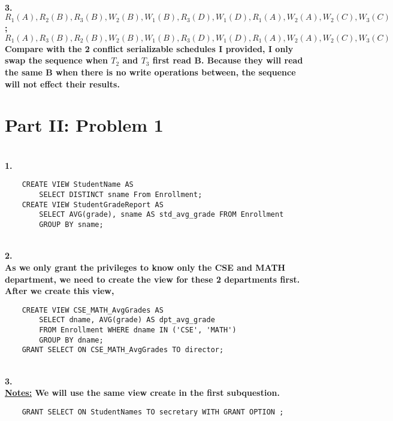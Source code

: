 \documentclass[letterpaper,11pt]{article}
\newcommand{\Paragraph}[1]{~\vspace*{-0.7\baselineskip}\\{\bf #1}}
\begin{document}
\Paragraph{3. \\
	\(R_1(A), R_2(B), R_3(B), W_2(B), W_1(B), R_3(D), W_1(D), R_1(A), W_2(A), W_2(C), W_3(C)\); \\
	\(R_1(A), R_3(B), R_2(B), W_2(B), W_1(B), R_3(D), W_1(D), R_1(A), W_2(A), W_2(C), W_3(C)\) \\
	Compare with the 2 conflict serializable schedules I provided, I only swap the sequence when \(T_2\) and \(T_3\) first read B. 
	Because they will read the same B when there is no write operations between, the sequence will not effect their results. 

}

\section*{Part II: Problem 1}
\Paragraph{1. 
}
\begin{verbatim}
	CREATE VIEW StudentName AS 
		SELECT DISTINCT sname From Enrollment; 
	CREATE VIEW StudentGradeReport AS 
		SELECT AVG(grade), sname AS std_avg_grade FROM Enrollment
		GROUP BY sname; 
\end{verbatim}

\newpage
\Paragraph{2. \\
	As we only grant the privileges to know only the CSE and MATH department, we need to create the view for these 2 departments first. \\
	After we create this view, 
}
\begin{verbatim}
	CREATE VIEW CSE_MATH_AvgGrades AS
		SELECT dname, AVG(grade) AS dpt_avg_grade
		FROM Enrollment WHERE dname IN ('CSE', 'MATH')
		GROUP BY dname;
	GRANT SELECT ON CSE_MATH_AvgGrades TO director;
\end{verbatim}

\Paragraph{3. \\
	\underline{Notes:} We will use the same view create in the first subquestion. 
}
\begin{verbatim}
	GRANT SELECT ON StudentNames TO secretary WITH GRANT OPTION ;
\end{verbatim}
\end{document}
